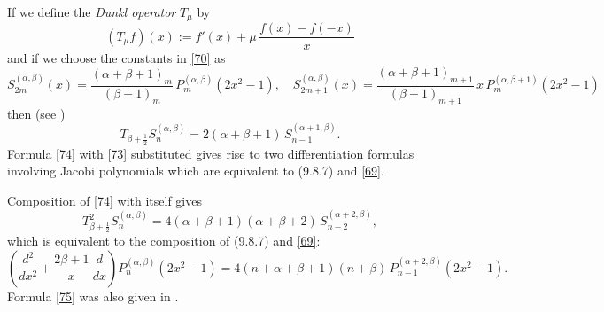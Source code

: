\documentclass[envcountchap,graybox]{svmono}
\newcommand\al\alpha
\newcommand\be\beta
\newcommand\half{\frac12}
\begin{document}
If we define the {\em Dunkl operator} $T_\mu$ by
\begin{equation}
(T_\mu f)(x):=f'(x)+\mu\,\frac{f(x)-f(-x)}x
\label{72}
\end{equation}
and if we choose the constants in \eqref{70} as
\begin{equation}
S_{2m}^{(\al,\be)}(x)=\frac{(\al+\be+1)_m}{(\be+1)_m}\, P_m^{(\al,\be)}(2x^2-1),\quad
S_{2m+1}^{(\al,\be)}(x)=\frac{(\al+\be+1)_{m+1}}{(\be+1)_{m+1}}\,
x\,P_m^{(\al,\be+1)}(2x^2-1)
\label{73}
\end{equation}
then (see \cite[(1.6)]{K5})
\begin{equation}
T_{\be+\half}S_n^{(\al,\be)}=2(\al+\be+1)\,S_{n-1}^{(\al+1,\be)}.
\label{74}
\end{equation}
Formula \eqref{74} with \eqref{73} substituted gives rise to two
differentiation formulas involving Jacobi polynomials which are equivalent to
(9.8.7) and \eqref{69}.

Composition of \eqref{74} with itself gives
\[
T_{\be+\half}^2S_n^{(\al,\be)}=4(\al+\be+1)(\al+\be+2)\,S_{n-2}^{(\al+2,\be)},
\]
which is equivalent to the composition of (9.8.7) and \eqref{69}:
\begin{equation}
\left(\frac{d^2}{dx^2}+\frac{2\be+1}x\,\frac d{dx}\right)P_n^{(\al,\be)}(2x^2-1)
=4(n+\al+\be+1)(n+\be)\,P_{n-1}^{(\al+2,\be)}(2x^2-1).
\label{75}
\end{equation}
Formula \eqref{75} was also given in .
%
\end{document}
